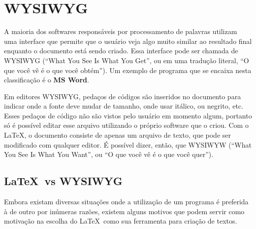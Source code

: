 \section{WYSIWYG}

A maioria dos softwares responsáveis por processamento de palavras utilizam uma interface que permite que o usuário veja algo muito similar ao resultado final enquanto o documento está sendo criado. Essa interface pode ser chamada de WYSIWYG (``What You See Is What You Get'', ou em uma tradução literal, ``O que você vê é o que você obtém''). Um exemplo de programa que se encaixa nesta classificação é o \textbf{MS Word}.

Em editores WYSIWYG, pedaços de códigos são inseridos no documento para indicar onde a fonte deve mudar de tamanho, onde usar itálico, ou negrito, etc. Esses pedaços de código não são vistos pelo usuário em momento algum, portanto só é possível editar esse arquivo utilizando o próprio software que o criou. Com o \LaTeX, o documento consiste de apenas um arquivo de texto, que pode ser modificado com qualquer editor. É possível dizer, então, que WYSIWYW (``What You See Is What You Want'', ou ``O que você vê é o que você quer'').

\subsection{\LaTeX\ vs WYSIWYG}%
Embora existam diversas situações onde a utilização de um programa é preferida à de outro por inúmeras razões, existem alguns motivos que podem servir como motivação na escolha do \LaTeX\ como sua ferramenta para criação de textos.

